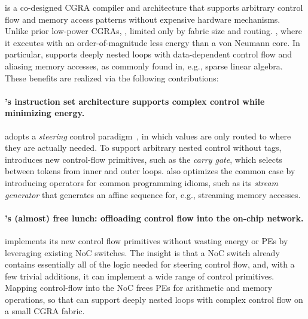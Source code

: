 \riptide is a co-designed CGRA compiler and architecture that
supports arbitrary control flow and memory access patterns
without expensive hardware mechanisms.
%
Unlike prior low-power CGRAs, , limited only by fabric size and routing.
%
,
where it executes with an order-of-magnitude less energy than a von
Neumann core.
%
In particular, \riptide supports deeply nested loops with
data-dependent control flow and aliasing memory accesses,
as commonly found in, e.g., sparse linear algebra.
%
These benefits are realized via the following contributions:

\paragraph{\riptide's instruction set architecture supports complex control while minimizing energy.}

%
\riptide adopts a \emph{steering} control
paradigm~\cite{dennis1975preliminary,swanson2003wavescalar,budiu2005dataflow},
in which values are only routed to where they are actually needed.
%
To support arbitrary nested control without tags, \riptide introduces new
control-flow primitives, such as the \emph{carry gate}, which selects
between tokens from inner and outer loops.
%
\riptide also optimizes the common case by introducing operators for
common programming idioms, such as its \emph{stream generator} that
generates an affine sequence for, e.g., streaming memory accesses.

\paragraph{\riptide's (almost) free lunch: offloading control flow into the on-chip network.}

\riptide implements its new control flow primitives without wasting energy
or PEs by leveraging existing NoC switches.
%
The insight is that a NoC switch already contains essentially all of
the logic needed for steering control flow, and, with a few
trivial additions, it can implement a wide range of control primitives.
%
Mapping control-flow into the NoC frees PEs for arithmetic and memory
operations, so that \riptide can support deeply nested loops with complex
control flow on a small CGRA fabric.


